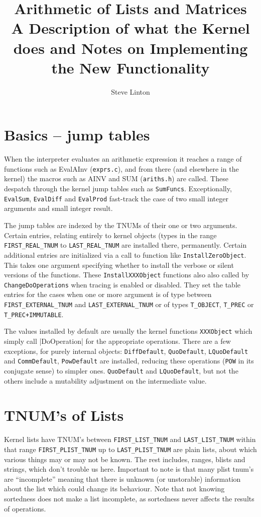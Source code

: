 \documentclass{article}
\title{Arithmetic of Lists and Matrices\\
A Description of what the Kernel does and Notes on Implementing the
New Functionality}
\author{Steve Linton}
\begin{document}
\maketitle
\section{Basics -- jump tables}

When the interpreter evaluates an arithmetic expression it reaches a
range of functions such as EvalAInv (\verb|exprs.c|), and from there
(and elsewhere in the kernel) the macros such as AINV and SUM
(\verb|ariths.h|) are called. These despatch through the kernel jump
tables such as \verb|SumFuncs|. Exceptionally, \verb|EvalSum|, \verb|EvalDiff| and
\verb|EvalProd| fast-track the case of two small integer arguments and
small integer result. 

The jump tables  are indexed by the TNUMs of their
one or two arguments. Certain entries, relating entirely to kernel
objects (types in the range \verb|FIRST_REAL_TNUM| to
\verb|LAST_REAL_TNUM| are installed there, permanently. 
Certain additional entries are initialized via a call to function like
\verb|InstallZeroObject|. This takes one argument specifying whether
to install the verbose or silent versions of the functions. These
\verb|InstallXXXObject| functions also also called by
\verb|ChangeDoOperations| when tracing is enabled or disabled. They
set the table entries for the cases when one or more argument  is of
type between \verb|FIRST_EXTERNAL_TNUM| and \verb|LAST_EXTERNAL_TNUM|
or of types \verb|T_OBJECT|, \verb|T_PREC| or \verb|T_PREC+IMMUTABLE|.


The values installed by default are usually the kernel functions
\verb|XXXObject| which simply call |DoOperation| for the appropriate
operations. There are a few exceptions, for purely internal objects:
\verb|DiffDefault|, \verb|QuoDefault|, \verb|LQuoDefault| and
\verb|CommDefault|, \verb|PowDefault|  are installed, reducing these
operations (\verb|POW| in its conjugate sense) to simpler
ones. \verb|QuoDefault| and \verb|LQuoDefault|, but not the others
include a mutability adjustment on the intermediate value.

\section{TNUM's of Lists}

Kernel lists have TNUM's between \verb|FIRST_LIST_TNUM| and
\verb|LAST_LIST_TNUM| within that range \verb|FIRST_PLIST_TNUM| up to
\verb|LAST_PLIST_TNUM| are plain lists, about which various things may
or may not be known. The rest includes, ranges, blists and strings,
which don't trouble us here.  Important to note is that many plist
tnum's are ``incomplete'' meaning that there is unknown (or
unstorable) information about the list which could change its
behaviour. Note that not knowing sortedness does not make a list
incomplete, as sortedness never affects the results of operations.
\end{document}
